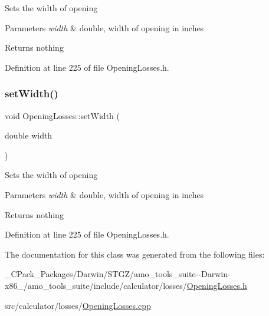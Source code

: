 Sets the width of opening


\begin{DoxyParams}{Parameters}
{\em width} & double, width of opening in inches\\
\hline
\end{DoxyParams}
\begin{DoxyReturn}{Returns}
nothing 
\end{DoxyReturn}


Definition at line 225 of file Opening\+Losses.\+h.

\mbox{\label{class_opening_losses_a5ee8c514917c16ecd2c63caecc98e1c6}} 
\subsubsection{\texorpdfstring{set\+Width()}{setWidth()}\hspace{0.1cm}{\footnotesize\ttfamily [3/3]}}
{\footnotesize\ttfamily void Opening\+Losses\+::set\+Width (\begin{DoxyParamCaption}\item[{double}]{width }\end{DoxyParamCaption})\hspace{0.3cm}{\ttfamily [inline]}}

Sets the width of opening


\begin{DoxyParams}{Parameters}
{\em width} & double, width of opening in inches\\
\hline
\end{DoxyParams}
\begin{DoxyReturn}{Returns}
nothing 
\end{DoxyReturn}


Definition at line 225 of file Opening\+Losses.\+h.



The documentation for this class was generated from the following files\+:\begin{DoxyCompactItemize}
\item 
\+\_\+\+C\+Pack\+\_\+\+Packages/\+Darwin/\+S\+T\+G\+Z/amo\+\_\+tools\+\_\+suite-\/-\/\+Darwin-\/x86\+\_/amo\+\_\+tools\+\_\+suite/include/calculator/losses/\hyperlink{___c_pack___packages_2_darwin_2_s_t_g_z_2amo__tools__suite--_darwin-x86__64_2amo__tools__suite_2d71043f6c6a078ed35d9feac98503cfb}{Opening\+Losses.\+h}\item 
src/calculator/losses/\hyperlink{_opening_losses_8cpp}{Opening\+Losses.\+cpp}\end{DoxyCompactItemize}
